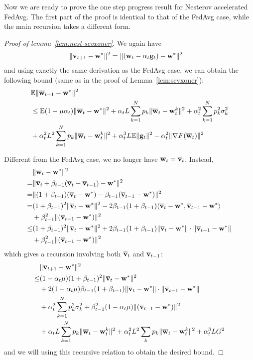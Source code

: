 Now we are ready to prove the one step progress result for Nesterov accelerated FedAvg. The first part of the proof is identical to that of the FedAvg case, while the main recursion takes a different form.
\begin{proof}[Proof of lemma~\ref{lem:nest-scvxoner}]
We again have 
\begin{align*}
\|{\overline{\mathbf{v}}}_{t+1}-{\mathbf{w}}^{\ast}\|^{2} & =\|({\overline{\mathbf{w}}}_{t}-\alpha_{t}{\mathbf{g}}_{t})-{\mathbf{w}}^{\ast}\|^{2}
\end{align*}
and using exactly the same derivation as the FedAvg case, we can obtain the following bound (same as \eq{\ref{eq:common recursion}} in the proof of Lemma~\ref{lem:scvxoner}):
\begin{align*}
	 &\mathbb{E}\|{\overline{\mathbf{w}}}_{t+1}-{\mathbf{w}}^{\ast}\|^{2} \\
	& \leq\mathbb{E}(1-\mu\alpha_{t})\|{\overline{\mathbf{w}}}_{t}-{\mathbf{w}}^{\ast}\|^{2}+\alpha_{t}L\sum_{k=1}^{N}p_{k}\|{\overline{\mathbf{w}}}_{t}-{\mathbf{w}}_{t}^{k}\|^{2}+\alpha_{t}^{2}\sum_{k=1}^{N}p_{k}^{2}\sigma_{k}^{2}\\
	& +\alpha_{t}^{2}L^{2}\sum_{k=1}^{N}p_{k}\|{\overline{\mathbf{w}}}_{t}-{\mathbf{w}}_{t}^{k}\|^{2}+\alpha_{t}^{3}L\mathbb{E}\|{\mathbf{g}}_{t}\|^{2}-\alpha_{t}^{2}\|\nabla F({\overline{\mathbf{w}}}_{t})\|^{2}
	\end{align*}

Different from the FedAvg case, we no longer have ${\overline{\mathbf{w}}}_{t}={\overline{\mathbf{v}}}_{t}$. Instead,
\begin{align*}
&\|{\overline{\mathbf{w}}}_{t}-{\mathbf{w}}^{\ast}\|^{2} \\
 =&\|{\overline{\mathbf{v}}}_{t}+\beta_{t-1}({\overline{\mathbf{v}}}_{t}-{\overline{\mathbf{v}}}_{t-1})-{\mathbf{w}}^{\ast}\|^{2}\\
=&\|(1+\beta_{t-1})({\overline{\mathbf{v}}}_{t}-{\mathbf{w}}^{\ast})-\beta_{t-1}({\overline{\mathbf{v}}}_{t-1}-{\mathbf{w}}^{\ast})\|^{2}\\
=&(1+\beta_{t-1})^{2}\|{\overline{\mathbf{v}}}_{t}-{\mathbf{w}}^{\ast}\|^{2}-2\beta_{t-1}(1+\beta_{t-1})\langle{\overline{\mathbf{v}}}_{t}-{\mathbf{w}}^{\ast},{\overline{\mathbf{v}}}_{t-1}-{\mathbf{w}}^{\ast}\rangle\\
&+\beta_{t-1}^{2}\|({\overline{\mathbf{v}}}_{t-1}-{\mathbf{w}}^{\ast})\|^{2}\\
\leq&(1+\beta_{t-1})^{2}\|{\overline{\mathbf{v}}}_{t}-{\mathbf{w}}^{\ast}\|^{2}+2\beta_{t-1}(1+\beta_{t-1})\|{\overline{\mathbf{v}}}_{t}-{\mathbf{w}}^{\ast}\|\cdot\|{\overline{\mathbf{v}}}_{t-1}-{\mathbf{w}}^{\ast}\|\\
&+\beta_{t-1}^{2}\|({\overline{\mathbf{v}}}_{t-1}-{\mathbf{w}}^{\ast})\|^{2}
\end{align*}
which gives a recursion involving both ${\overline{\mathbf{v}}}_{t}$ and ${\overline{\mathbf{v}}}_{t-1}$:
\begin{align*}
&\|{\overline{\mathbf{v}}}_{t+1}-{\mathbf{w}}^{\ast}\|^{2} \\
\leq&(1-\alpha_{t}\mu)(1+\beta_{t-1})^{2}\|{\overline{\mathbf{v}}}_{t}-{\mathbf{w}}^{\ast}\|^{2}\\
& +2(1-\alpha_{t}\mu)\beta_{t-1}(1+\beta_{t-1})\|{\overline{\mathbf{v}}}_{t}-{\mathbf{w}}^{\ast}\|\cdot\|{\overline{\mathbf{v}}}_{t-1}-{\mathbf{w}}^{\ast}\|\\
&+\alpha_{t}^{2}\sum_{k=1}^{N}p_{k}^{2}\sigma_{k}^{2}+\beta_{t-1}^{2}(1-\alpha_{t}\mu)\|({\overline{\mathbf{v}}}_{t-1}-{\mathbf{w}}^{\ast})\|^{2}\\
&+\alpha_{t}L\sum_{k=1}^{N}p_{k}\|{\overline{\mathbf{w}}}_{t}-{\mathbf{w}}_{t}^{k}\|^{2}+\alpha_{t}^{2}L^{2}\sum_{k}p_{k}\|{\overline{\mathbf{w}}}_{t}-{\mathbf{w}}_{t}^{k}\|^{2}+\alpha_{t}^{3}LG^{2}
\end{align*}
and we will using this recursive relation to obtain the desired bound. 


\end{proof}
